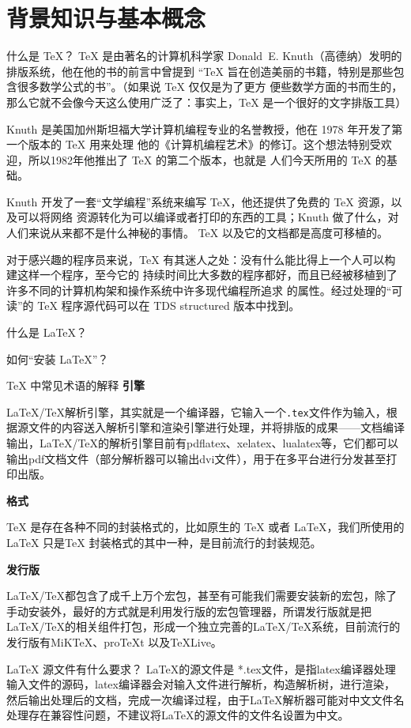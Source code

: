 \section{背景知识与基本概念}

\begin{faq}{什么是 \TeX{}？}
\TeX{} 是由著名的计算机科学家 Donald~E. Knuth（高德纳）发明的排版系统，他在他的书的前言中曾提到%
“\TeX{} 旨在创造美丽的书籍，特别是那些包含很多数学公式的书”。（如果说 \TeX{} 仅仅是为了更方
便些数学方面的书而生的，那么它就不会像今天这么使用广泛了：事实上，\TeX{} 是一个很好的文字排版工具）

Knuth 是美国加州斯坦福大学计算机编程专业的名誉教授，他在 1978 年开发了第一个版本的 \TeX{} 用来处理
他的《计算机编程艺术》的修订。这个想法特别受欢迎，所以1982年他推出了 \TeX{} 的第二个版本，也就是
人们今天所用的 \TeX{} 的基础。

Knuth 开发了一套“文学编程”系统来编写 \TeX{}，他还提供了免费的 \TeX{} 资源，以及可以将网络
资源转化为可以编译或者打印的东西的工具；Knuth 做了什么，对人们来说从来都不是什么神秘的事情。
\TeX{} 以及它的文档都是高度可移植的。

对于感兴趣的程序员来说，\TeX{} 有其迷人之处：没有什么能比得上一个人可以构建这样一个程序，至今它的
持续时间比大多数的程序都好，而且已经被移植到了许多不同的计算机构架和操作系统中许多现代编程所追求
的属性。经过处理的“可读”的 \TeX{} 程序源代码可以在 TDS structured 版本中找到。

\end{faq}

\begin{faq}{什么是 \LaTeX{}？}
\end{faq}

\begin{faq}{如何“安装 \LaTeX{}”？}
\end{faq}

\begin{faq}{\TeX{} 中常见术语的解释}
\textbf{引擎}
  
\LaTeX/\TeX{}解析引擎，其实就是一个编译器，它输入一个\verb|.tex|文件作为输入，根据源文件的内容送入解析引擎和渲染引擎进行处理，并将排版的成果——文档编译输出，\LaTeX/\TeX{}的解析引擎目前有pdflatex、xelatex、lualatex等，它们都可以输出pdf文档文件（部分解析器可以输出dvi文件），用于在多平台进行分发甚至打印出版。

\textbf{格式}

\TeX{} 是存在各种不同的封装格式的，比如原生的 \TeX{} 或者 \LaTeX{}，我们所使用的 \LaTeX{} 只是\TeX{} 封装格式的其中一种，是目前流行的封装规范。

\textbf{发行版}

\LaTeX/\TeX{}都包含了成千上万个宏包，甚至有可能我们需要安装新的宏包，除了手动安装外，最好的方式就是利用发行版的宏包管理器，所谓发行版就是把\LaTeX/\TeX{}的相关组件打包，形成一个独立完善的\LaTeX/\TeX{}系统，目前流行的发行版有MiKTeX、proTeXt 以及TeXLive。
\end{faq}


\begin{faq}{}

\end{faq}

\begin{faq}{\LaTeX{} 源文件有什么要求？}
LaTeX的源文件是 *.tex文件，是指latex编译器处理输入文件的源码，latex编译器会对输入文件进行解析，构造解析树，进行渲染，然后输出处理后的文档，完成一次编译过程，由于LaTeX解析器可能对中文文件名处理存在兼容性问题，不建议将LaTeX的源文件的文件名设置为中文。
\end{faq}
